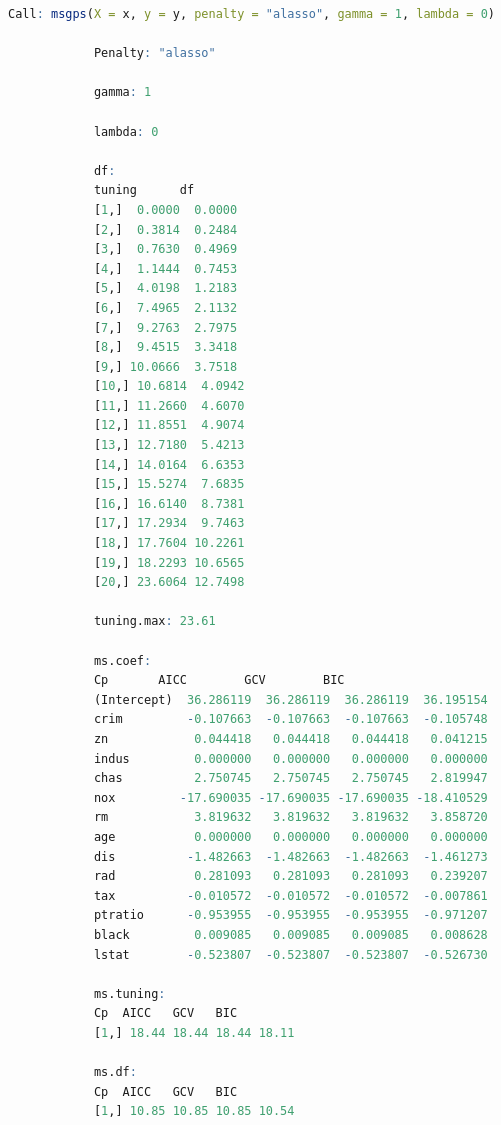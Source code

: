 \documentclass[12pt, a4paper, oneside]{ctexart}
\begin{document}
\begin{appendices}
\begin{table}[htbp]
		\end{table}
		\newpage
		
		\begin{lstlisting}[language=R, caption={自适应Lasso回归的结果}]
			Call: msgps(X = x, y = y, penalty = "alasso", gamma = 1, lambda = 0)
			
			Penalty: "alasso"
			
			gamma: 1
			
			lambda: 0
			
			df:
			tuning      df
			[1,]  0.0000  0.0000
			[2,]  0.3814  0.2484
			[3,]  0.7630  0.4969
			[4,]  1.1444  0.7453
			[5,]  4.0198  1.2183
			[6,]  7.4965  2.1132
			[7,]  9.2763  2.7975
			[8,]  9.4515  3.3418
			[9,] 10.0666  3.7518
			[10,] 10.6814  4.0942
			[11,] 11.2660  4.6070
			[12,] 11.8551  4.9074
			[13,] 12.7180  5.4213
			[14,] 14.0164  6.6353
			[15,] 15.5274  7.6835
			[16,] 16.6140  8.7381
			[17,] 17.2934  9.7463
			[18,] 17.7604 10.2261
			[19,] 18.2293 10.6565
			[20,] 23.6064 12.7498
			
			tuning.max: 23.61
			
			ms.coef:
			Cp       AICC        GCV        BIC
			(Intercept)  36.286119  36.286119  36.286119  36.195154
			crim         -0.107663  -0.107663  -0.107663  -0.105748
			zn            0.044418   0.044418   0.044418   0.041215
			indus         0.000000   0.000000   0.000000   0.000000
			chas          2.750745   2.750745   2.750745   2.819947
			nox         -17.690035 -17.690035 -17.690035 -18.410529
			rm            3.819632   3.819632   3.819632   3.858720
			age           0.000000   0.000000   0.000000   0.000000
			dis          -1.482663  -1.482663  -1.482663  -1.461273
			rad           0.281093   0.281093   0.281093   0.239207
			tax          -0.010572  -0.010572  -0.010572  -0.007861
			ptratio      -0.953955  -0.953955  -0.953955  -0.971207
			black         0.009085   0.009085   0.009085   0.008628
			lstat        -0.523807  -0.523807  -0.523807  -0.526730
			
			ms.tuning:
			Cp  AICC   GCV   BIC
			[1,] 18.44 18.44 18.44 18.11
			
			ms.df:
			Cp  AICC   GCV   BIC
			[1,] 10.85 10.85 10.85 10.54
		\end{lstlisting}
	\end{appendices}
	
\end{document}
